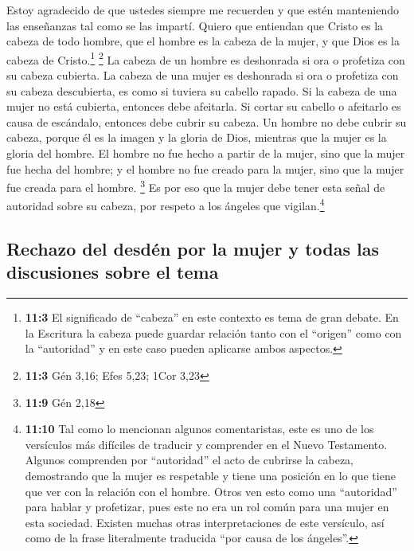  Estoy agradecido de que ustedes siempre me recuerden y
que estén manteniendo las enseñanzas tal como se las impartí.
 Quiero que entiendan que Cristo es la cabeza de todo
hombre, que el hombre es la cabeza de la mujer, y que Dios es la cabeza
de Cristo.\footnote{\textbf{11:3} El significado de ``cabeza'' en este
  contexto es tema de gran debate. En la Escritura la cabeza puede
  guardar relación tanto con el ``origen'' como con la ``autoridad'' y
  en este caso pueden aplicarse ambos aspectos.} \footnote{\textbf{11:3}
  Gén 3,16; Efes 5,23; 1Cor 3,23}  La cabeza de un hombre
es deshonrada si ora o profetiza con su cabeza cubierta. 
La cabeza de una mujer es deshonrada si ora o profetiza con su cabeza
descubierta, es como si tuviera su cabello rapado.  Si la
cabeza de una mujer no está cubierta, entonces debe afeitarla. Si cortar
su cabello o afeitarlo es causa de escándalo, entonces debe cubrir su
cabeza.  Un hombre no debe cubrir su cabeza, porque él es
la imagen y la gloria de Dios, mientras que la mujer es la gloria del
hombre.  El hombre no fue hecho a partir de la mujer, sino
que la mujer fue hecha del hombre;  y el hombre no fue
creado para la mujer, sino que la mujer fue creada para el hombre.
\footnote{\textbf{11:9} Gén 2,18}  Es por eso que la
mujer debe tener esta señal de autoridad sobre su cabeza, por respeto a
los ángeles que vigilan.\footnote{\textbf{11:10} Tal como lo mencionan
  algunos comentaristas, este es uno de los versículos más difíciles de
  traducir y comprender en el Nuevo Testamento. Algunos comprenden por
  ``autoridad'' el acto de cubrirse la cabeza, demostrando que la mujer
  es respetable y tiene una posición en lo que tiene que ver con la
  relación con el hombre. Otros ven esto como una ``autoridad'' para
  hablar y profetizar, pues este no era un rol común para una mujer en
  esta sociedad. Existen muchas otras interpretaciones de este
  versículo, así como de la frase literalmente traducida ``por causa de
  los ángeles''.}

\hypertarget{rechazo-del-desduxe9n-por-la-mujer-y-todas-las-discusiones-sobre-el-tema}{%
\subsection{Rechazo del desdén por la mujer y todas las discusiones
sobre el
tema}\label{rechazo-del-desduxe9n-por-la-mujer-y-todas-las-discusiones-sobre-el-tema}}

